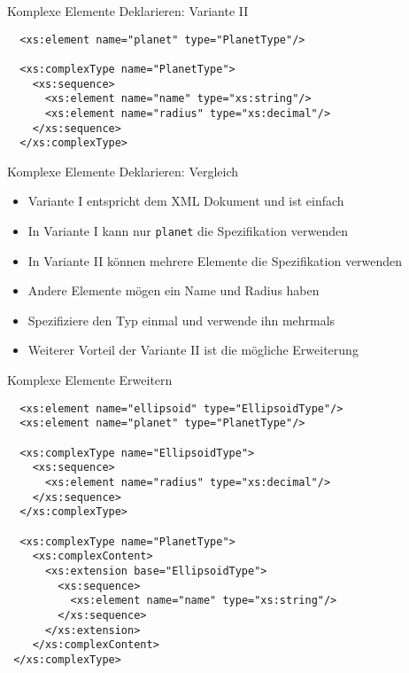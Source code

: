 \documentclass{beamer}
\begin{document}
\begin{frame}[fragile]{Komplexe Elemente Deklarieren: Variante II}
	
	\lstset{language=XML}
	\begin{lstlisting}	
  <xs:element name="planet" type="PlanetType"/>
	
  <xs:complexType name="PlanetType">
    <xs:sequence>
      <xs:element name="name" type="xs:string"/>
      <xs:element name="radius" type="xs:decimal"/>
    </xs:sequence>
  </xs:complexType>
	\end{lstlisting}
	
\end{frame}

\begin{frame}{Komplexe Elemente Deklarieren: Vergleich}
	
	\begin{itemize}
		\item Variante I entspricht dem XML Dokument und ist einfach
		\item In Variante I kann nur \texttt{planet} die Spezifikation verwenden
		\item In Variante II können mehrere Elemente die Spezifikation verwenden
		\item Andere Elemente mögen ein Name und Radius haben
		\item Spezifiziere den Typ einmal und verwende ihn mehrmals
		\item Weiterer Vorteil der Variante II ist die mögliche Erweiterung
	\end{itemize}
	
\end{frame}

\begin{frame}[fragile]{Komplexe Elemente Erweitern}
	
	\small
	\lstset{language=XML}
	\begin{lstlisting}	
  <xs:element name="ellipsoid" type="EllipsoidType"/>
  <xs:element name="planet" type="PlanetType"/>
	
  <xs:complexType name="EllipsoidType">
    <xs:sequence>
      <xs:element name="radius" type="xs:decimal"/>
    </xs:sequence>
  </xs:complexType>
  
  <xs:complexType name="PlanetType">
    <xs:complexContent>
      <xs:extension base="EllipsoidType">
        <xs:sequence>
          <xs:element name="name" type="xs:string"/>
        </xs:sequence>
      </xs:extension>
    </xs:complexContent>
 </xs:complexType>
	\end{lstlisting}
	
\end{frame}
\end{document}
